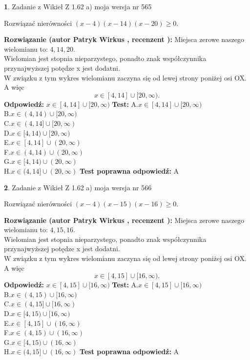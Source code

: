 \documentclass[12pt, a4paper]{article}
\theoremstyle{definition} %
\newtheorem{zad}{}
\newcommand{\zadStart}[1]{\begin{zad}#1\newline}
\newcommand{\zadStop}{\end{zad}}
\newcommand{\rozwStart}[2]{\noindent \textbf{Rozwiązanie (autor #1 , recenzent #2): }\newline}
\newcommand{\rozwStop}{\newline}
\newcommand{\odpStart}{\noindent \textbf{Odpowiedź:}\newline}
\newcommand{\odpStop}{\newline}
\newcommand{\testStart}{\noindent \textbf{Test:}\newline}
\newcommand{\testStop}{\newline}
\newcommand{\kluczStart}{\noindent \textbf{Test poprawna odpowiedź:}\newline}
\newcommand{\kluczStop}{\newline}
\begin{document}
\zadStart{Zadanie z Wikieł Z 1.62 a) moja wersja nr 565}

Rozwiązać nierówności $(x-4)(x-14)(x-20)\ge0$.
\zadStop
\rozwStart{Patryk Wirkus}{}
Miejsca zerowe naszego wielomianu to: $4, 14, 20$.\\
Wielomian jest stopnia nieparzystego, ponadto znak współczynnika przy\linebreak najwyższej potędze x jest dodatni.\\ W związku z tym wykres wielomianu zaczyna się od lewej strony poniżej osi OX. A więc $$x \in [4,14] \cup [20,\infty).$$
\rozwStop
\odpStart
$x \in [4,14] \cup [20,\infty)$
\odpStop
\testStart
A.$x \in [4,14] \cup [20,\infty)$\\
B.$x \in (4,14) \cup [20,\infty)$\\
C.$x \in (4,14] \cup [20,\infty)$\\
D.$x \in [4,14) \cup [20,\infty)$\\
E.$x \in [4,14] \cup (20,\infty)$\\
F.$x \in (4,14) \cup (20,\infty)$\\
G.$x \in [4,14) \cup (20,\infty)$\\
H.$x \in (4,14] \cup (20,\infty)$
\testStop
\kluczStart
A
\kluczStop



\zadStart{Zadanie z Wikieł Z 1.62 a) moja wersja nr 566}

Rozwiązać nierówności $(x-4)(x-15)(x-16)\ge0$.
\zadStop
\rozwStart{Patryk Wirkus}{}
Miejsca zerowe naszego wielomianu to: $4, 15, 16$.\\
Wielomian jest stopnia nieparzystego, ponadto znak współczynnika przy\linebreak najwyższej potędze x jest dodatni.\\ W związku z tym wykres wielomianu zaczyna się od lewej strony poniżej osi OX. A więc $$x \in [4,15] \cup [16,\infty).$$
\rozwStop
\odpStart
$x \in [4,15] \cup [16,\infty)$
\odpStop
\testStart
A.$x \in [4,15] \cup [16,\infty)$\\
B.$x \in (4,15) \cup [16,\infty)$\\
C.$x \in (4,15] \cup [16,\infty)$\\
D.$x \in [4,15) \cup [16,\infty)$\\
E.$x \in [4,15] \cup (16,\infty)$\\
F.$x \in (4,15) \cup (16,\infty)$\\
G.$x \in [4,15) \cup (16,\infty)$\\
H.$x \in (4,15] \cup (16,\infty)$
\testStop
\kluczStart
A
\kluczStop
\end{document}
